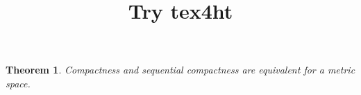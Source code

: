 \documentclass{article}
\title{Try tex4ht}
\theoremstyle{plain}
\newtheorem{thm}{Theorem}
\begin{document}
\maketitle
\begin{thm}
Compactness and sequential compactness are equivalent for a metric space.
\end{thm}
\end{document}
